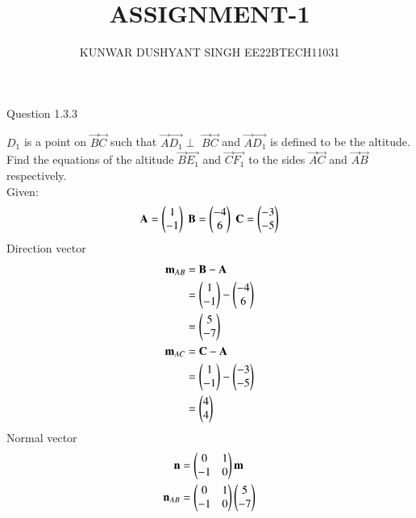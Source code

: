 \documentclass[journal,12pt,twocolumn]{IEEEtran}
\theoremstyle{remark}
\begin{document}



\vspace{3cm}

\title{
ASSIGNMENT-1
}
\author{ KUNWAR DUSHYANT SINGH EE22BTECH11031}


\maketitle

\newpage


\bigskip

\renewcommand{\thefigure}{\theenumi}
\renewcommand{\thetable}{\theenumi}

Question 1.3.3 

$D_{1}$ is a point on $\vec{B}$$\vec{C}$ such that
$\vec{A}$$\vec{D_{1}}$$\perp$ $\vec{B}$$\vec{C}$ and $\vec{A}$$\vec{D_{1}}$  is defined to be the altitude.
Find the equations of the altitude $\vec{B}$$\vec{E_{1}}$ and $\vec{C}$$\vec{F_{1}}$
to the sides $\vec{A}$$\vec{C}$ and $\vec{A}$$\vec{B}$ respectively.
\\ \solution
Given:
\begin{align}\mathbf{A}=\begin{pmatrix}1\\-1\end{pmatrix} \;
\mathbf{B}=\begin{pmatrix}-4 \\6\end{pmatrix} \;
\mathbf{C}=\begin{pmatrix}-3\\-5\end{pmatrix}
\end{align}
Direction vector 
\begin{align}
\mathbf{m}_{AB}&=\mathbf{B}-\mathbf{A} \\
&=\begin{pmatrix}1\\-1\end{pmatrix}-\begin{pmatrix}-4 \\6\end{pmatrix} \\
&=\begin{pmatrix}5\\-7\end{pmatrix} \\
\mathbf{m}_{AC}&=\mathbf{C}-\mathbf{A} \\
&=\begin{pmatrix}1\\-1\\\end{pmatrix}-\begin{pmatrix}-3 \\-5\end{pmatrix} \\
&=\begin{pmatrix}4\\4\\\end{pmatrix}
\end{align}
Normal vector
\begin{align}
\vec{n}&=\myvec{0&1 \\-1&0}\vec{m} \\
\vec{n}_{AB}&=\myvec{0&1 \\-1&0}\myvec{5\\-7} \\

\end{align}$$
\end{document}

